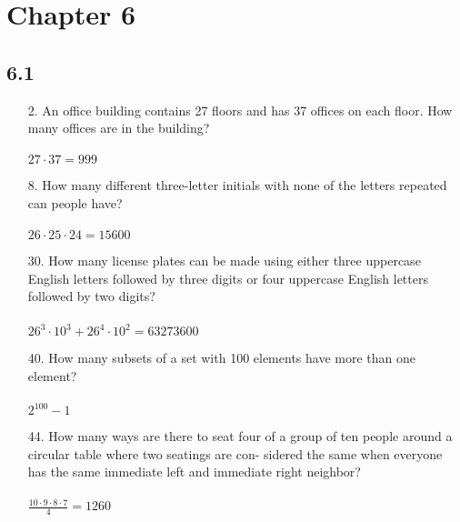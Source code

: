 \section{Chapter 6}
\subsection{6.1}
\begin{itemize}
    \item[2.]  An office building contains 27 floors and has 37 offices
          on each floor. How many offices are in the building? \\
          \answer \\
          $27 \cdot 37 = 999$

    \item[8.]  How many different three-letter initials with none of the
          letters repeated can people have? \\
          \answer \\
          $26 \cdot 25 \cdot 24 = 15600$

    \item[30.]  How many license plates can be made using either three
          uppercase English letters followed by three digits or four
          uppercase English letters followed by two digits? \\
          \answer\\
          $26^3 \cdot 10^3 + 26^4 \cdot 10^2 = 63273600$

    \item[40.] How many subsets of a set with 100 elements have more
          than one element?\\
          \answer \\
          $2^{100} -1$

    \item[44.]  How many ways are there to seat four of a group of ten
          people around a circular table where two seatings are con-
          sidered the same when everyone has the same immediate
          left and immediate right neighbor? \\
          \answer \\
          $\frac{10 \cdot 9 \cdot 8 \cdot 7}{4} = 1260$

\end{itemize}

